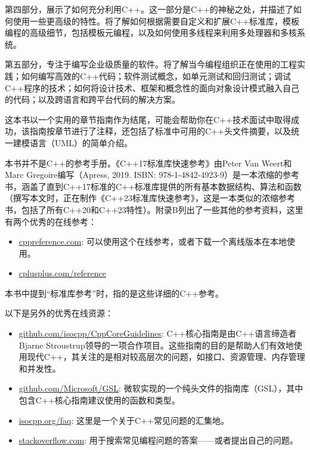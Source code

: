 第四部分，展示了如何充分利用C++。这一部分是C++的神秘之处，并描述了如何使用一些更高级的特性。将了解如何根据需要自定义和扩展C++标准库，模板编程的高级细节，包括模板元编程，以及如何使用多线程来利用多处理器和多核系统。

第五部分，专注于编写企业级质量的软件。将了解当今编程组织正在使用的工程实践；如何编写高效的C++代码；软件测试概念，如单元测试和回归测试；调试C++程序的技术；如何将设计技术、框架和概念性的面向对象设计模式融入自己的代码；以及跨语言和跨平台代码的解决方案。

这本书以一个实用的章节指南作为结尾，可能会帮助你在C++技术面试中取得成功，该指南按章节进行了注释，还包括了标准中可用的C++头文件摘要，以及统一建模语言（UML）的简单介绍。

本书并不是C++的参考手册。《C++17标准库快速参考》由Peter Van Weert和Marc Gregoire编写（Apress, 2019. ISBN: 978-1-4842-4923-9）是一本浓缩的参考书，涵盖了直到C++17标准的C++标准库提供的所有基本数据结构、算法和函数（撰写本文时，正在制作《C++23标准库快速参考》，这是一本类似的浓缩参考书，包括了所有C++20和C++23特性）。附录B列出了一些其他的参考资料，这里有两个优秀的在线参考：

\begin{itemize}
\item
\url{cppreference.com}: 可以使用这个在线参考，或者下载一个离线版本在本地使用。

\item
\url{cplusplus.com/reference}
\end{itemize}

本书中提到“标准库参考”时，指的是这些详细的C++参考。

以下是另外的优秀在线资源：

\begin{itemize}
\item
\url{github.com/isocpp/CppCoreGuidelines}: C++核心指南是由C++语言缔造者Bjarne Stroustrup领导的一项合作项目。这些指南的目的是帮助人们有效地使用现代C++，其关注的是相对较高层次的问题，如接口、资源管理、内存管理和并发性。

\item
\url{github.com/Microsoft/GSL}: 微软实现的一个纯头文件的指南库（GSL），其中包含C++核心指南建议使用的函数和类型。

\item
\url{isocpp.org/faq}: 这里是一个关于C++常见问题的汇集地。

\item
\url{stackoverflow.com}: 用于搜索常见编程问题的答案——或者提出自己的问题。
\end{itemize}

